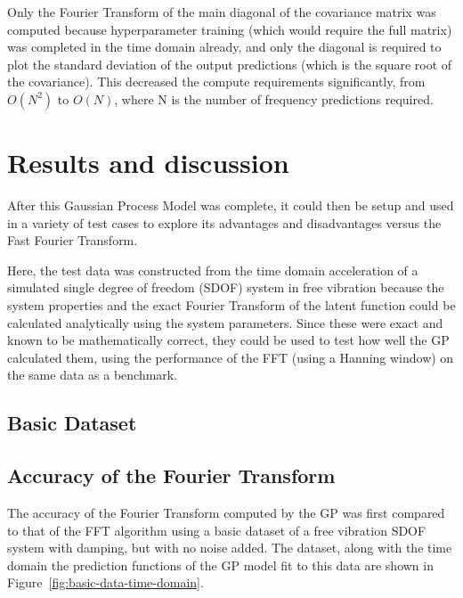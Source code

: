 \documentclass[12pt]{article}
\begin{document}

    Only the Fourier Transform of the main diagonal of the covariance matrix was computed because hyperparameter training (which would require the full matrix) was completed in the time domain already, and only the diagonal is required to plot the standard deviation of the output predictions (which is the square root of the covariance).
    This decreased the compute requirements significantly, from $O(N^2)$ to $O(N)$, where N is the number of frequency predictions required.



    \section{Results and discussion}
    After this Gaussian Process Model was complete, it could then be setup and used in a variety of test cases to explore its advantages and disadvantages versus the Fast Fourier Transform.

    Here, the test data was constructed from the time domain acceleration of a simulated single degree of freedom (SDOF) system in free vibration because the system properties and the exact Fourier Transform of the latent function could be calculated analytically using the system parameters.
    Since these were exact and known to be mathematically correct, they could be used to test how well the GP calculated them, using the performance of the FFT (using a Hanning window) on the same data as a benchmark.

    \subsection{Basic Dataset}
    \subsection{Accuracy of the Fourier Transform} \label{Acc}
    The accuracy of the Fourier Transform computed by the GP was first compared to that of the FFT algorithm using a basic dataset of a free vibration SDOF system with damping, but with no noise added.
    The dataset, along with the time domain the prediction functions of the GP model fit to this data are shown in Figure~\ref{fig:basic-data-time-domain}.
\end{document}
